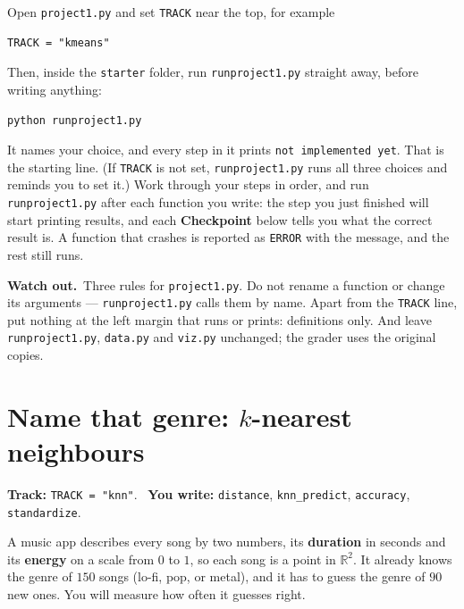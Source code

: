 \documentclass[11pt]{article}
\theoremstyle{definition}
\newcommand{\heads}[1]{\par\smallskip\noindent
  {\small\sffamily\textcolor{BrickRed}{\textbf{Watch out.}}\ #1}\par\smallskip}
\newcommand{\R}{\mathbb{R}}
\newcommand{\file}[1]{\texttt{#1}}
\begin{document}
\noindent Open \file{project1.py} and set \texttt{TRACK} near the top, for
example
\begin{lstlisting}
TRACK = "kmeans"
\end{lstlisting}
\noindent Then, inside the \file{starter} folder, run \file{runproject1.py} straight away,
before writing anything:
\begin{lstlisting}[language={}]
python runproject1.py
\end{lstlisting}

\noindent It names your choice, and every step in it prints \texttt{not
implemented yet}. That is the starting line. (If \texttt{TRACK} is not set,
\file{runproject1.py} runs all three choices and reminds you to set it.) Work through your steps
in order, and run \file{runproject1.py} after each function you write: the step you just
finished will start printing results, and each \textbf{Checkpoint} below tells
you what the correct result is. A function that crashes is reported as
\texttt{ERROR} with the message, and the rest still runs.

\heads{Three rules for \file{project1.py}. Do not rename a function or change
its arguments --- \file{runproject1.py} calls them by name. Apart from the \texttt{TRACK}
line, put nothing at the left margin that runs or prints: definitions only. And
leave \file{runproject1.py}, \file{data.py} and \file{viz.py} unchanged; the
grader uses the original copies.}

\clearpage
\section{Name that genre: $k$-nearest neighbours}
\noindent\textbf{Track:} \texttt{TRACK = "knn"}. \ \textbf{You write:}
\texttt{distance}, \texttt{knn\_predict}, \texttt{accuracy},
\texttt{standardize}.

\medskip
\noindent A music app describes every song by two numbers, its
\textbf{duration} in seconds and its \textbf{energy} on a scale from $0$ to $1$,
so each song is a point in $\R^{2}$. It already knows the genre of $150$ songs
(lo-fi, pop, or metal), and it has to guess the genre of $90$ new ones. You
will measure how often it guesses right.
\end{document}
